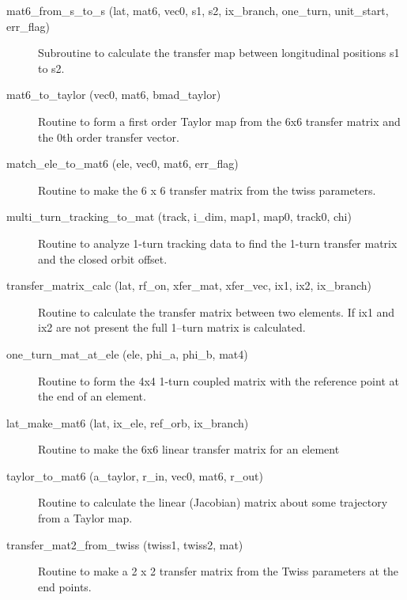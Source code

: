 \begin{description}
\label{r:mat6.from.s.to.s}
\item[mat6_from_s_to_s (lat, mat6, vec0, s1, s2, ix_branch, one_turn, unit_start, err_flag)] \Newline 
Subroutine to calculate the transfer map between longitudinal positions
s1 to s2.

\item[mat6_to_taylor (vec0, mat6, bmad_taylor)] \Newline
Routine to form a first order Taylor map from the 6x6 transfer matrix 
and the 0th order transfer vector. 

\label{r:match.ele.to.mat6}
\item[match_ele_to_mat6 (ele, vec0, mat6, err_flag)] \Newline 
Routine to make the 6 x 6 transfer matrix from the twiss parameters.

\item[multi_turn_tracking_to_mat (track, i_dim, map1, map0, track0, chi)] \Newline
Routine to analyze 1-turn tracking data to find the 1-turn transfer matrix 
and the closed orbit offset.

\label{r:transfer.matrix.calc}
\item[transfer_matrix_calc (lat, rf_on, xfer_mat, xfer_vec, ix1, ix2, ix_branch)] \Newline
Routine to calculate the transfer matrix between two elements. If
ix1 and ix2 are not present the full 1--turn matrix is calculated.

\label{r:one.turn.mat.at.ele}
\item[one_turn_mat_at_ele (ele, phi_a, phi_b, mat4)] \Newline
Routine to form the 4x4 1-turn coupled matrix with the reference point 
at the end of an element. 

\label{r:lat.make.mat6}
\item[lat_make_mat6 (lat, ix_ele, ref_orb, ix_branch)] \Newline
Routine to make the 6x6 linear transfer matrix for an element 

\item[taylor_to_mat6 (a_taylor, r_in, vec0, mat6, r_out)] \Newline
Routine to calculate the linear (Jacobian) matrix about some trajectory from a Taylor map. 

\label{r:transfer.mat2.from.twiss}
\item[transfer_mat2_from_twiss (twiss1, twiss2, mat)] \Newline
Routine to make a 2 x 2 transfer matrix from the Twiss parameters at the end points. 


\end{description}
